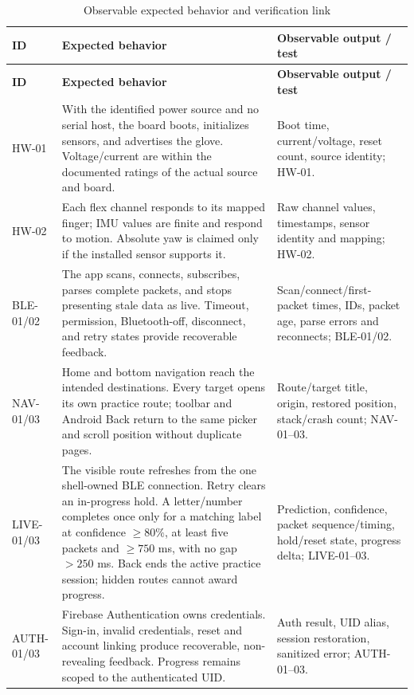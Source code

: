 \documentclass[10pt,letterpaper]{article}
\begin{document}
\begin{longtable}{@{}P{0.78in}P{3.27in}P{2.88in}@{}}
\caption{Observable expected behavior and verification link}\label{tab:behavior}\\
\toprule\textbf{ID} & \textbf{Expected behavior} & \textbf{Observable output / test}\\\midrule
\endfirsthead\toprule\textbf{ID} & \textbf{Expected behavior} & \textbf{Observable output / test}\\\midrule\endhead\bottomrule\endlastfoot
HW-01 & With the identified power source and no serial host, the board boots, initializes sensors, and advertises the glove. Voltage/current are within the documented ratings of the actual source and board. & Boot time, current/voltage, reset count, source identity; HW-01. \\
HW-02 & Each flex channel responds to its mapped finger; IMU values are finite and respond to motion. Absolute yaw is claimed only if the installed sensor supports it. & Raw channel values, timestamps, sensor identity and mapping; HW-02. \\
BLE-01/02 & The app scans, connects, subscribes, parses complete packets, and stops presenting stale data as live. Timeout, permission, Bluetooth-off, disconnect, and retry states provide recoverable feedback. & Scan/connect/first-packet times, IDs, packet age, parse errors and reconnects; BLE-01/02. \\
NAV-01/03 & Home and bottom navigation reach the intended destinations. Every target opens its own practice route; toolbar and Android Back return to the same picker and scroll position without duplicate pages. & Route/target title, origin, restored position, stack/crash count; NAV-01--03. \\
LIVE-01/03 & The visible route refreshes from the one shell-owned BLE connection. Retry clears an in-progress hold. A letter/number completes once only for a matching label at confidence $\geq80\%$, at least five packets and $\geq750$ ms, with no gap $>250$ ms. Back ends the active practice session; hidden routes cannot award progress. & Prediction, confidence, packet sequence/timing, hold/reset state, progress delta; LIVE-01--03. \\
AUTH-01/03 & Firebase Authentication owns credentials. Sign-in, invalid credentials, reset and account linking produce recoverable, non-revealing feedback. Progress remains scoped to the authenticated UID. & Auth result, UID alias, session restoration, sanitized error; AUTH-01--03. \\

\end{longtable}
\end{document}
